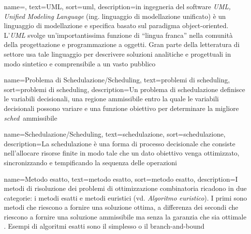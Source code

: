 
\renewcommand{\acronymname}{Acronimi e abbreviazioni}




\renewcommand{\glossaryname}{Glossario}

{
    name=,
    text=UML,
    sort=uml,
    description={in ingegneria del software \emph{UML, Unified Modeling Language} (ing. linguaggio di modellazione unificato) è un linguaggio di modellazione e specifica basato sul paradigma object-oriented. L'\emph{UML} svolge un'importantissima funzione di ``lingua franca'' nella comunità della progettazione e programmazione a oggetti. Gran parte della letteratura di settore usa tale linguaggio per descrivere soluzioni analitiche e progettuali in modo sintetico e comprensibile a un vasto pubblico}
}

{
    name=Problema di Schedulazione/Scheduling,
    text=problemi di scheduling,
    sort=problemi di scheduling,
    description={Un problema di schedulazione definisce le variabili decisionali, una regione ammissibile entro la quale le variabili decisionali possono variare e una funzione obiettivo per determinare la migliore \emph{\gls{sched}}\glsfirstoccur\ ammissibile}
}

{
    name=Schedulazione/Scheduling,
    text=schedulazione,
    sort=schedulazione,
    description={La schedulazione è una forma di processo decisionale che consiste nell'allocare risorse finite in modo tale che un dato obiettivo venga ottimizzato, sincronizzando e tempificando la sequenza delle operazioni}
}

{
    name=Metodo esatto,
    text=metodo esatto,
    sort=metodo esatto,
    description={I metodi di risoluzione dei problemi di ottimizzazione combinatoria ricadono in due categorie: i metodi esatti e metodi euristici (vd. \textit{Algoritmo euristico}). I primi sono metodi che riescono a fornire una soluzione ottima, a differenza dei secondi che riescono a fornire una soluzione ammissibile ma senza la garanzia che sia ottimale \cite{degio:dispensa}.
    Esempi di algoritmi esatti sono il simplesso o il branch-and-bound}
}

